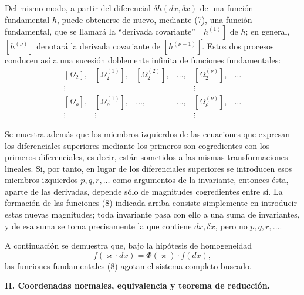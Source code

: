 \documentclass[11pt]{article}
\begin{document}
Del mismo modo, a partir del diferencial \(\delta h(dx,\delta x)\) de una
función fundamental \(h\), puede obtenerse de nuevo, mediante (7), una función
fundamental, que se llamará la ``derivada covariante'' \([h^{(1)}]\) de \(h\);
en general, \([h^{(\nu)}]\) denotará la derivada covariante de
\([h^{(\nu-1)}]\). Estos dos procesos conducen así a una sucesión doblemente
infinita de funciones fundamentales:
\begin{equation}
\begin{array}{cccccc}
[\Omega_2], & [\Omega_2^{(1)}], & [\Omega_2^{(2)}], & \ldots,
& [\Omega_2^{(\nu)}], & \ldots\\
\vdots &&&& \vdots&\\
{}[\Omega_\rho], & [\Omega_\rho^{(1)}], & \ldots, & \ldots,
& [\Omega_\rho^{(\nu)}], & \ldots\\
\vdots & \vdots &&& \vdots&
\end{array}
\tag{8}
\end{equation}

Se muestra además que los miembros izquierdos de las ecuaciones que expresan
los diferenciales superiores mediante los primeros son cogredientes con los
primeros diferenciales, es decir, están sometidos a las mismas transformaciones
lineales. Si, por tanto, en lugar de los diferenciales superiores se introducen
esos miembros izquierdos \(p,q,r,\ldots\) como argumentos de la invariante,
entonces ésta, aparte de las derivadas, depende sólo de magnitudes cogredientes
entre sí. La formación de las funciones (8) indicada arriba consiste simplemente
en introducir estas nuevas magnitudes; toda invariante pasa con ello a una suma
de invariantes, y de esa suma se toma precisamente la que contiene
\(dx,\delta x\), pero no \(p,q,r,\ldots\).

A continuación se demuestra que, bajo la hipótesis de homogeneidad
\[
f(\varkappa\cdot dx)=\Phi(\varkappa)\cdot f(dx),
\]
las funciones fundamentales (8) agotan el sistema completo buscado.

\begin{center}
\textbf{II. Coordenadas normales, equivalencia y teorema de reducción.}
\end{center}
\end{document}

